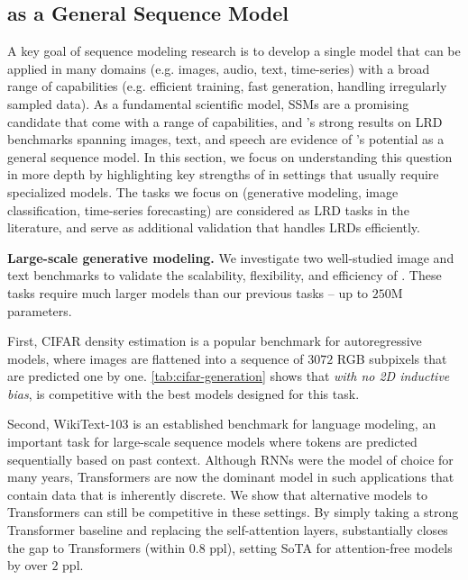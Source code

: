 \subsection{\methodabbrv{} as a General Sequence Model}
\label{sec:experiments-general}

A key goal of sequence modeling research is to develop a single model that can be applied in many domains (e.g. images, audio, text, time-series) with a broad range of capabilities (e.g. efficient training, fast generation, handling irregularly sampled data).
As a fundamental scientific model, SSMs are a promising candidate that come with a range of capabilities, and \methodabbrv's strong results on LRD benchmarks spanning images, text, and speech are evidence of \methodabbrv's potential as a general sequence model.
In this section, we focus on understanding this question in more depth by highlighting key strengths of \methodabbrv{} in settings that usually require specialized models.
The tasks we focus on (generative modeling, image classification, time-series forecasting)
are considered as LRD tasks in the literature,
and serve as additional validation that \methodabbrv{} handles LRDs efficiently.


\textbf{Large-scale generative modeling.}
We investigate two well-studied image and text benchmarks to validate the scalability, flexibility, and efficiency of \methodabbrv.
These tasks require much larger models than our previous tasks -- up to $250$M parameters.

First, CIFAR density estimation is a popular benchmark for autoregressive models, where images are flattened into a sequence of $3072$ RGB subpixels that are predicted one by one.
\cref{tab:cifar-generation} shows that \emph{with no 2D inductive bias}, \methodabbrv{} is competitive with the best models designed for this task.

Second, WikiText-103 is an established benchmark for language modeling, an important task for large-scale sequence models where tokens are predicted sequentially based on past context.
Although RNNs were the model of choice for many years, Transformers are now the dominant model in such applications that contain data that is inherently discrete.
We show that alternative models to Transformers can still be competitive in these settings.
By simply taking a strong Transformer baseline \citep{baevski2018adaptive} and replacing the self-attention layers,
\methodabbrv{} substantially closes the gap to Transformers (within $0.8$ ppl), setting SoTA for attention-free models by over $2$ ppl.

